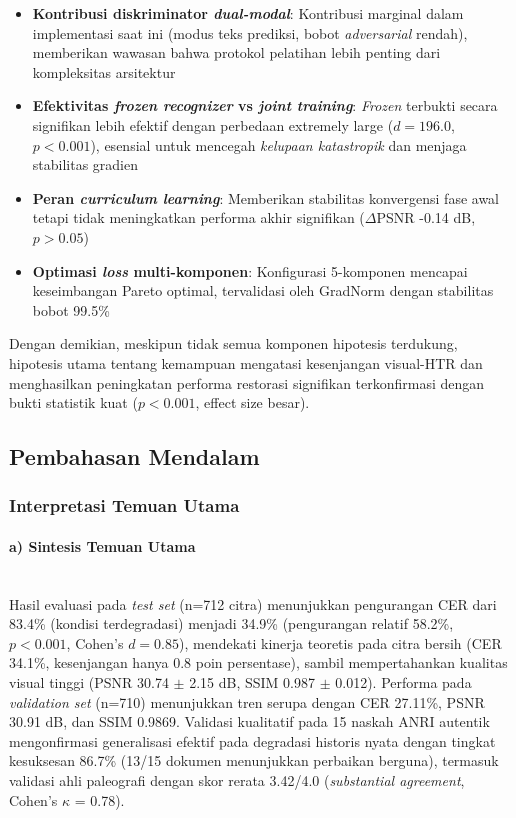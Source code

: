 \documentclass[12pt,a4paper]{article}
\begin{document}
\begin{itemize}[nosep]
    \item \textbf{Kontribusi diskriminator \textit{dual-modal}}: Kontribusi marginal dalam implementasi saat ini (modus teks prediksi, bobot \textit{adversarial} rendah), memberikan wawasan bahwa protokol pelatihan lebih penting dari kompleksitas arsitektur
    \item \textbf{Efektivitas \textit{frozen recognizer} vs \textit{joint training}}: \textit{Frozen} terbukti secara signifikan lebih efektif dengan perbedaan extremely large ($d=196.0$, $p<0.001$), esensial untuk mencegah \textit{kelupaan katastropik} dan menjaga stabilitas gradien
    \item \textbf{Peran \textit{curriculum learning}}: Memberikan stabilitas konvergensi fase awal tetapi tidak meningkatkan performa akhir signifikan ($\Delta$PSNR -0.14 dB, $p>0.05$)
    \item \textbf{Optimasi \textit{loss} multi-komponen}: Konfigurasi 5-komponen mencapai keseimbangan Pareto optimal, tervalidasi oleh GradNorm dengan stabilitas bobot 99.5\%
\end{itemize}

Dengan demikian, meskipun tidak semua komponen hipotesis terdukung, hipotesis utama tentang kemampuan mengatasi kesenjangan visual-HTR dan menghasilkan peningkatan performa restorasi signifikan terkonfirmasi dengan bukti statistik kuat ($p<0.001$, effect size besar).

\vspace{0.8em}

\subsection{Pembahasan Mendalam}
\label{subsec:pembahasan-mendalam}
\vspace{0.8em}

\subsubsection{Interpretasi Temuan Utama}
\label{subsubsec:interpretasi-temuan}

\paragraph{a) Sintesis Temuan Utama}\mbox{}\\[0.1em]

Hasil evaluasi pada \textit{test set} (n=712 citra) menunjukkan pengurangan CER dari 83.4\% (kondisi terdegradasi) menjadi 34.9\% (pengurangan relatif 58.2\%, $p<0.001$, Cohen's $d=0.85$), mendekati kinerja teoretis pada citra bersih (CER 34.1\%, kesenjangan hanya 0.8 poin persentase), sambil mempertahankan kualitas visual tinggi (PSNR 30.74 $\pm$ 2.15 dB, SSIM 0.987 $\pm$ 0.012). Performa pada \textit{validation set} (n=710) menunjukkan tren serupa dengan CER 27.11\%, PSNR 30.91 dB, dan SSIM 0.9869. Validasi kualitatif pada 15 naskah ANRI autentik mengonfirmasi generalisasi efektif pada degradasi historis nyata dengan tingkat kesuksesan 86.7\% (13/15 dokumen menunjukkan perbaikan berguna), termasuk validasi ahli paleografi dengan skor rerata 3.42/4.0 (\textit{substantial agreement}, Cohen's $\kappa$ = 0.78).
\end{document}
